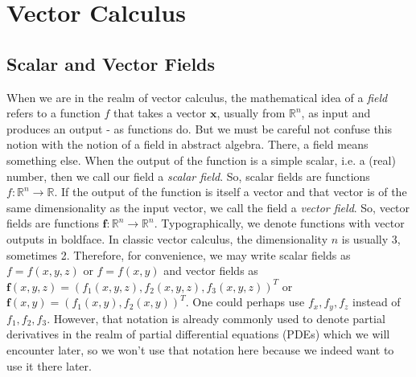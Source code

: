 \section{Vector Calculus} 

\subsection{Scalar and Vector Fields}
When we are in the realm of vector calculus, the mathematical idea of a \emph{field} refers to a function $f$ that takes a vector $\mathbf{x}$, usually from $\mathbb{R}^n$, as input and produces an output - as functions do. But we must be careful not confuse this notion with the notion of a field in abstract algebra. There, a field means something else. When the output of the function is a simple scalar, i.e. a (real) number, then we call our field a \emph{scalar field}. So, scalar fields are functions $f: \mathbb{R}^n \rightarrow \mathbb{R}$. If the output of the function is itself a vector and that vector is of the same dimensionality as the input vector, we call the field a \emph{vector field}. So, vector fields are functions $\mathbf{f}: \mathbb{R}^n \rightarrow \mathbb{R}^n$. Typographically, we denote functions with vector outputs in boldface. In classic vector calculus, the dimensionality $n$ is usually 3, sometimes 2. Therefore, for convenience, we may write scalar fields as $f = f(x,y,z)$ or $f = f(x,y)$ and vector fields as $\mathbf{f}(x,y,z) = (f_1(x,y,z), f_2(x,y,z), f_3(x,y,z))^T$ or $\mathbf{f}(x,y) = (f_1(x,y), f_2(x,y))^T$. One could perhaps use $f_x, f_y, f_z$ instead of $f_1, f_2, f_3$. However, that notation is already commonly used to denote partial derivatives in the realm of partial differential equations (PDEs) which we will encounter later, so we won't use that notation here because we indeed want to use it there later. 





